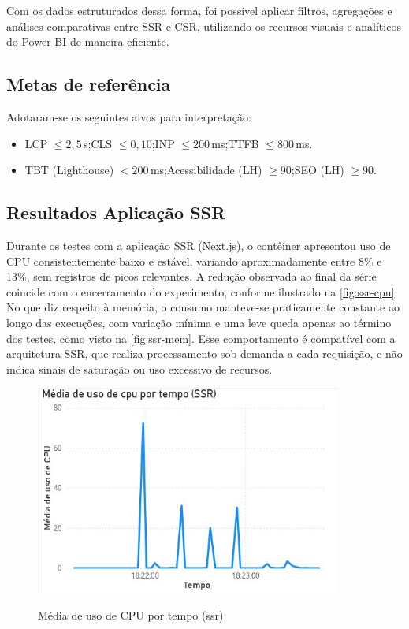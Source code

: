 {Com os dados estruturados dessa forma, foi possível aplicar filtros, agregações e análises comparativas entre SSR e CSR, utilizando os recursos visuais e analíticos do Power BI de maneira eficiente.

\subsection{Metas de referência}
Adotaram-se os seguintes alvos para interpretação:
\begin{itemize}
    \item LCP $\leq 2{,}5$\,s;\quad CLS $\leq 0{,}10$;\quad INP $\leq 200$\,ms;\quad TTFB $\leq 800$\,ms.
    \item TBT (Lighthouse) $<200$\,ms;\quad Acessibilidade (LH) $\geq 90$;\quad SEO (LH) $\geq 90$.
\end{itemize}

\subsection{Resultados Aplicação SSR}
\label{subsec:resultados-ssr}

Durante os testes com a aplicação SSR (Next.js), o contêiner apresentou uso de CPU consistentemente baixo e estável, variando aproximadamente entre 8\% e 13\%, sem registros de picos relevantes. A redução observada ao final da série coincide com o encerramento do experimento, conforme ilustrado na \autoref{fig:ssr-cpu}. No que diz respeito à memória, o consumo manteve-se praticamente constante ao longo das execuções, com variação mínima e uma leve queda apenas ao término dos testes, como visto na \autoref{fig:ssr-mem}. Esse comportamento é compatível com a arquitetura SSR, que realiza processamento sob demanda a cada requisição, e não indica sinais de saturação ou uso excessivo de recursos.

\begin{figure}[H]
    \centering
    \caption{Média de uso de CPU por tempo (\acrshort{ssr})}
    \includegraphics[width=0.9\textwidth]{media/uso_cpu_ssr.jpeg}
    \label{fig:ssr-cpu}
\end{figure}

}
